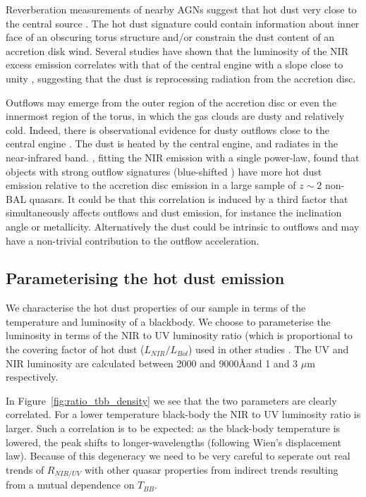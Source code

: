 Reverberation measurements of nearby AGNs suggest that hot dust very close to the central source \citep[few tens of light days; e.g.][]{minezaki04,suganuma06}. 
The hot dust signature could contain information about inner face of an obscuring torus structure and/or constrain the dust content of an accretion disk wind. 
Several studies have shown that the luminosity of the NIR excess emission correlates with that of the central engine with a slope close to unity \cite[e.g.][]{gallagher07}, suggesting that the dust is reprocessing radiation from the accretion disc. 

Outflows may emerge from the outer region of the accretion disc or even the innermost region of the torus, in which the gas clouds are dusty and relatively cold.  
Indeed, there is observational evidence for dusty outflows close to the central engine \citep[e.g.][]{bowler14}.
The dust is heated by the central engine, and radiates in the near-infrared band. 
\citet{wang13}, fitting the NIR emission with a single power-law, found that objects with strong outflow signatures (blue-shifted ) have more hot dust emission relative to the accretion disc emission in a large sample of $z\sim2$ non-BAL quasars. 
It could be that this correlation is induced by a third factor that simultaneously affects outflows and dust emission, for instance the inclination angle or metallicity. 
Alternatively the dust could be intrinsic to outflows and may have a non-trivial contribution to the outflow acceleration.

\subsection{Parameterising the hot dust emission}

We characterise the hot dust properties of our sample in terms of the temperature and luminosity of a blackbody.  
We choose to parameterise the luminosity in terms of the NIR to UV luminosity ratio (which is proportional to the covering factor of hot dust ($L_{NIR}/L_{Bol}$) used in other studies \citep{roseboom13}. 
The UV and NIR luminosity are calculated between 2000 and 9000\AA and 1 and 3 $\mu$m respectively.

In Figure~\ref{fig:ratio_tbb_density} we see that the two parameters are clearly correlated. 
For a lower temperature black-body the NIR to UV luminosity ratio is larger. 
Such a correlation is to be expected: as the black-body temperature is lowered, the peak shifts to longer-wavelengths (following Wien's displacement law). 
Because of this degeneracy we need to be very careful to seperate out real trends of $R_{NIR/UV}$ with other quasar properties from indirect trends resulting from a mutual dependence on $T_{BB}$.  

